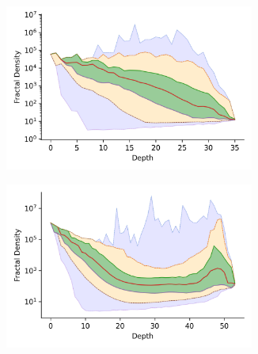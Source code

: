 \documentclass{article}
\begin{document}
\begin{figure}
    \captionsetup[subfigure]{aboveskip=-15pt,belowskip=-3pt}
    \begin{subfigure}[b]{0.47\textwidth}
        \includegraphics[width=0.9\textwidth]{images/fractal_density/fashion-mnist.png}\\
        \label{fig:supplement:fashion-mnist-fractal_density}
    \end{subfigure}%
    \begin{subfigure}[b]{0.47\textwidth}
            \includegraphics[width=0.9\textwidth]{images/fractal_density/glove-25.png}\\
            \label{fig:supplement:glove-25-fractal_density}
    \end{subfigure}
    \\
    \begin{subfigure}[b]{0.47\textwidth}

\end{subfigure}
\end{figure}
\end{document}
